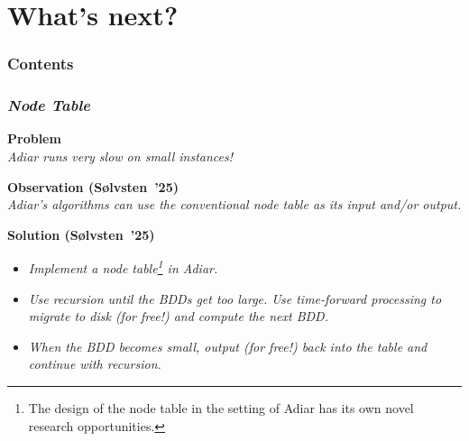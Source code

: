 \documentclass[english, aspectratio=169]{beamer}
\begin{document}
\section{What's next?}

\begin{frame}{}
  \frametitle{Contents}
  \tableofcontents[currentsection]
\end{frame}

\begin{frame}
  \frametitle{\secname}

  \begin{center}
    \begin{tikzpicture}
      
    \end{tikzpicture}
  \end{center}
\end{frame}

\begin{frame}
  \frametitle{\secname\quad \emph{Node Table}}

  \textbf{Problem}\\
  \emph{Adiar runs very slow on small instances!}

  \textbf{Observation (S{\o}lvsten~'25)}\\
  \emph{Adiar's algorithms can use the conventional node table as its input and/or output.}

  \pause
  \smallskip
  \textbf{Solution (S{\o}lvsten~'25)}\\
  \begin{itemize}
  \item \emph{Implement a node table\footnote{The design of the node table in the setting of Adiar
        has its own novel research opportunities.} in Adiar.}
  \item \emph{Use recursion until the BDDs get too large. Use time-forward processing to migrate to
      disk (for free!) and compute the next BDD.}
  \item \emph{When the BDD becomes small, output (for free!) back into the table and continue with
      recursion.}
  \end{itemize}
\end{frame}
\end{document}
